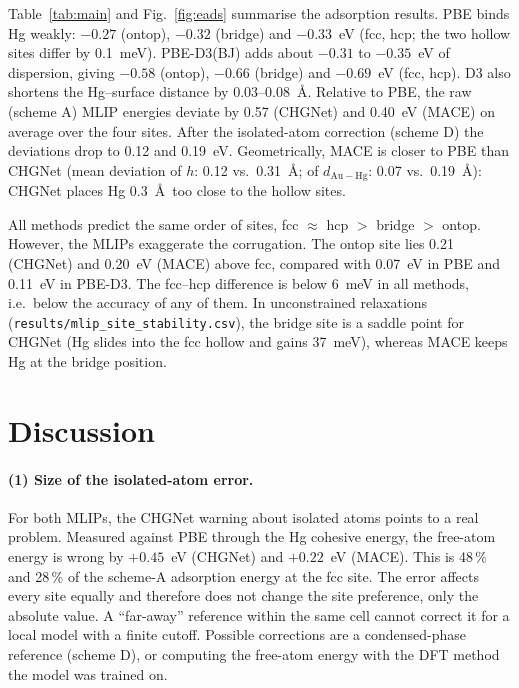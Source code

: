 \documentclass[11pt,a4paper]{article}
\begin{document}
Table~\ref{tab:main} and Fig.~\ref{fig:eads} summarise the adsorption results. PBE binds Hg weakly: $-0.27$ (ontop), $-0.32$ (bridge) and $-0.33$~eV (fcc, hcp; the two hollow sites differ by 0.1~meV). PBE-D3(BJ) adds about $-0.31$ to $-0.35$~eV of dispersion, giving $-0.58$ (ontop), $-0.66$ (bridge) and $-0.69$~eV (fcc, hcp). D3 also shortens the Hg--surface distance by 0.03--0.08~\AA. Relative to PBE, the raw (scheme A) MLIP energies deviate by 0.57 (CHGNet) and 0.40~eV (MACE) on average over the four sites. After the isolated-atom correction (scheme D) the deviations drop to 0.12 and 0.19~eV. Geometrically, MACE is closer to PBE than CHGNet (mean deviation of $h$: 0.12 vs.\ 0.31~\AA; of $d_\mathrm{Au-Hg}$: 0.07 vs.\ 0.19~\AA): CHGNet places Hg 0.3~\AA\ too close to the hollow sites.

All methods predict the same order of sites, fcc $\approx$ hcp $>$ bridge $>$ ontop. However, the MLIPs exaggerate the corrugation. The ontop site lies 0.21 (CHGNet) and 0.20~eV (MACE) above fcc, compared with 0.07~eV in PBE and 0.11~eV in PBE-D3. The fcc--hcp difference is below 6~meV in all methods, i.e.\ below the accuracy of any of them. In unconstrained relaxations (\texttt{results/mlip\_site\_stability.csv}), the bridge site is a saddle point for CHGNet (Hg slides into the fcc hollow and gains 37~meV), whereas MACE keeps Hg at the bridge position.

\section{Discussion}
\paragraph{(1) Size of the isolated-atom error.} For both MLIPs, the CHGNet warning about isolated atoms points to a real problem. Measured against PBE through the Hg cohesive energy, the free-atom energy is wrong by $+0.45$~eV (CHGNet) and $+0.22$~eV (MACE). This is 48\,\% and 28\,\% of the scheme-A adsorption energy at the fcc site. The error affects every site equally and therefore does not change the site preference, only the absolute value. A ``far-away'' reference within the same cell cannot correct it for a local model with a finite cutoff. Possible corrections are a condensed-phase reference (scheme D), or computing the free-atom energy with the DFT method the model was trained on.
\end{document}
